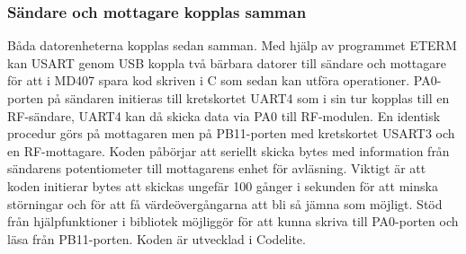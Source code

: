\documentclass[a4paper]{article}
\begin{document}
\subsubsection{Sändare och mottagare kopplas samman}
\vspace{5mm} \noindent
Båda datorenheterna kopplas sedan samman. Med hjälp av programmet ETERM kan USART genom USB koppla två bärbara datorer till sändare och mottagare för att i MD407 spara kod skriven i C som sedan kan utföra operationer. PA0-porten på sändaren initieras till kretskortet UART4 som i sin tur kopplas till en RF-sändare, UART4 kan då skicka data via PA0 till RF-modulen. En identisk procedur görs på mottagaren men på PB11-porten med kretskortet USART3 och en RF-mottagare. Koden påbörjar att seriellt skicka bytes med information från sändarens potentiometer till mottagarens enhet för avläsning. Viktigt är att koden initierar bytes att skickas ungefär 100 gånger i sekunden för att minska störningar och för att få värdeövergångarna att bli så jämna som möjligt. Stöd från hjälpfunktioner i bibliotek möjliggör för att kunna skriva till PA0-porten och läsa från PB11-porten. Koden är utvecklad i Codelite.









\end{document}
